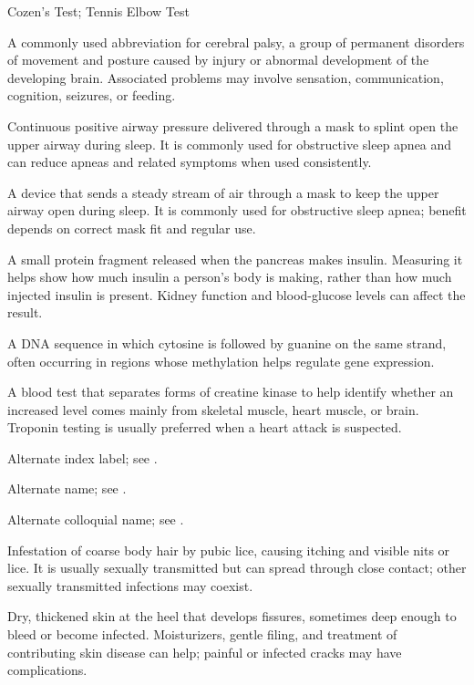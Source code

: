 \synonyms
Cozen's Test; Tennis Elbow Test

 A commonly used abbreviation for cerebral palsy, a group of permanent disorders of movement and posture caused by injury or abnormal development of the developing brain. Associated problems may involve sensation, communication, cognition, seizures, or feeding.

 Continuous positive airway pressure delivered through a mask to splint open the upper airway during sleep. It is
commonly used for obstructive sleep apnea and can reduce apneas and related symptoms
when used consistently.

 A device that sends a steady stream of air through a mask to keep the upper airway open during sleep. It is commonly used for obstructive sleep apnea; benefit depends on correct mask fit and regular use.

 A small protein fragment released when the pancreas makes insulin. Measuring it helps show how much insulin a person's body is making, rather than how much injected insulin is present. Kidney function and blood-glucose levels can affect the result.

 A DNA sequence in which cytosine is followed by guanine on the same strand, often occurring in regions whose methylation helps regulate gene expression.

 A blood test that separates forms of creatine kinase to help identify whether an increased level comes mainly from skeletal muscle, heart muscle, or brain. Troponin testing is usually preferred when a heart attack is suspected.

 Alternate index label; see .

 Alternate name; see .

 Alternate colloquial name; see .

 Infestation of coarse body hair by pubic lice, causing itching and visible nits or lice. It is usually sexually transmitted but can spread through close contact; other sexually transmitted infections may coexist.

 Dry, thickened skin at the heel that develops fissures, sometimes deep enough to bleed or become infected. Moisturizers, gentle filing, and treatment of contributing skin disease can help; painful or infected cracks may have complications.

